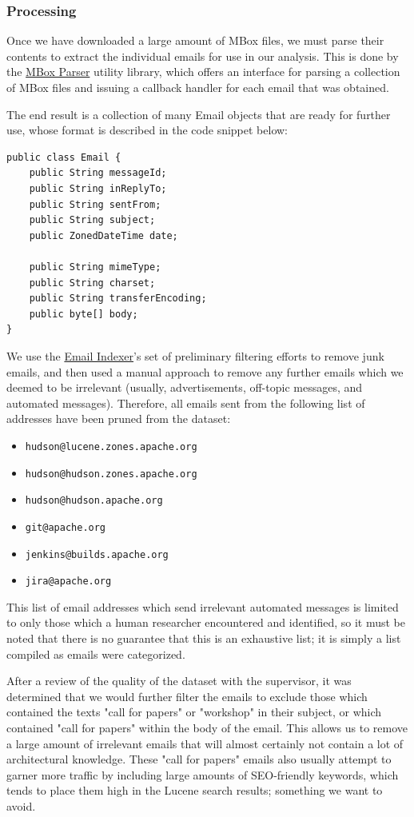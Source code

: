 \documentclass[a4paper, 12pt]{article}
\begin{document}
		\subsubsection{Processing}
			Once we have downloaded a large amount of MBox files, we must parse their contents to extract the individual emails for use in our analysis. This is done by the \hyperref[sec:mbox-parser]{MBox Parser} utility library, which offers an interface for parsing a collection of MBox files and issuing a callback handler for each email that was obtained.
			
			The end result is a collection of many Email objects that are ready for further use, whose format is described in the code snippet below:
			\begin{verbatim}
public class Email {
	public String messageId;
	public String inReplyTo;
	public String sentFrom;
	public String subject;
	public ZonedDateTime date;
	
	public String mimeType;
	public String charset;
	public String transferEncoding;
	public byte[] body;
}
			\end{verbatim}
		
			We use the \hyperref[sec:email-indexer]{Email Indexer}'s set of preliminary filtering efforts to remove junk emails, and then used a manual approach to remove any further emails which we deemed to be irrelevant (usually, advertisements, off-topic messages, and automated messages). Therefore, all emails sent from the following list of addresses have been pruned from the dataset:
			\begin{itemize}
				\item \texttt{hudson@lucene.zones.apache.org}
				\item \texttt{hudson@hudson.zones.apache.org}
				\item \texttt{hudson@hudson.apache.org}
				\item \texttt{git@apache.org}
				\item \texttt{jenkins@builds.apache.org}
				\item \texttt{jira@apache.org}
			\end{itemize}
			This list of email addresses which send irrelevant automated messages is limited to only those which a human researcher encountered and identified, so it must be noted that there is no guarantee that this is an exhaustive list; it is simply a list compiled as emails were categorized.
		
			After a review of the quality of the dataset with the supervisor, it was determined that we would further filter the emails to exclude those which contained the texts "call for papers" or "workshop" in their subject, or which contained "call for papers" within the body of the email. This allows us to remove a large amount of irrelevant emails that will almost certainly not contain a lot of architectural knowledge. These "call for papers" emails also usually attempt to garner more traffic by including large amounts of SEO-friendly keywords, which tends to place them high in the Lucene search results; something we want to avoid.
	
\end{document}
